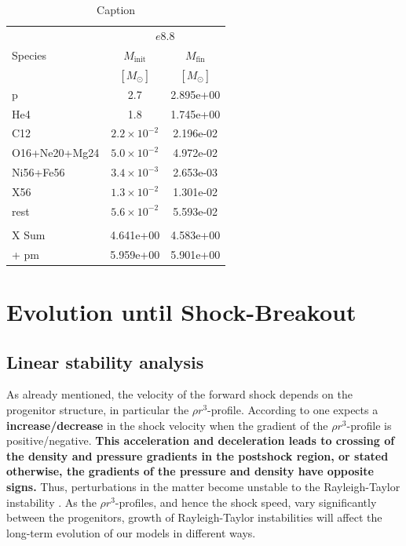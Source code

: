 \documentclass[fleqn,usenatbib]{mnras}
\begin{document}
\begin{table}
    \centering
    \begin{tabular}{lcc}
        &
        \multicolumn{2}{c}{$e8.8$} \\
         Species &
         $M_{\mathrm{init}}$ &
         $M_{\mathrm{fin}}$ \\
                 &
         $[M_{\mathrm{\odot}}]$ &
         $[M_{\mathrm{\odot}}]$ \\
         \hline 
            p               & 2.7                & 2.895e+00 \\
            He4             & 1.8                & 1.745e+00 \\
            C12             & $2.2\times10^{-2}$ & 2.196e-02 \\
            O16+Ne20+Mg24   & $5.0\times10^{-2}$ & 4.972e-02 \\
            Ni56+Fe56       & $3.4\times10^{-3}$ & 2.653e-03 \\
            X56             & $1.3\times10^{-2}$ & 1.301e-02 \\
            rest            & $5.6\times10^{-2}$ & 5.593e-02 \\
            \hline \\
            X Sum           & 4.641e+00 & 4.583e+00 \\
            + pm            & 5.959e+00 & 5.901e+00   
    \end{tabular}
    \caption{Caption}
    \label{tab:my_label}
\end{table}

\section{Evolution until Shock-Breakout}
\label{sec:Evolution until Shock-Breakout}
\subsection{Linear stability analysis}
\label{sec:Linear stability analysis}
As already mentioned, the velocity of the forward shock depends on the progenitor structure, in particular the $\rho r^3$-profile. According to \cite{Sedov1961} one expects a \textbf{increase/decrease} in the shock velocity when the gradient of the $\rho r^3$-profile is positive/negative. 
\textbf{This acceleration and deceleration leads to crossing of the density and pressure gradients in the postshock region, or stated otherwise, the gradients of the pressure and density have opposite signs.} Thus, perturbations in the matter become unstable to the Rayleigh-Taylor instability \citep{Rayleigh1882,Chevalier1978}. As the $\rho r^3 $-profiles, and hence the shock speed, vary significantly between the progenitors, growth of Rayleigh-Taylor instabilities will affect the long-term evolution of our models in different ways.
\end{document}
